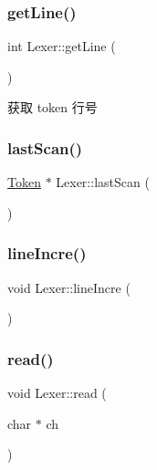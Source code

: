 \mbox{\label{class_lexer_a0ede40225695d9eb9b42d275584cf8f0}} 
\subsubsection{\texorpdfstring{get\+Line()}{getLine()}}
{\footnotesize\ttfamily int Lexer\+::get\+Line (\begin{DoxyParamCaption}{ }\end{DoxyParamCaption})\hspace{0.3cm}{\ttfamily [static]}}



获取 token 行号 

\mbox{\label{class_lexer_a28eb3e3a349bcbc7a0b03e16bb42192f}} 
\subsubsection{\texorpdfstring{last\+Scan()}{lastScan()}}
{\footnotesize\ttfamily \hyperlink{class_token}{Token} $\ast$ Lexer\+::last\+Scan (\begin{DoxyParamCaption}{ }\end{DoxyParamCaption})\hspace{0.3cm}{\ttfamily [private]}}

\mbox{\label{class_lexer_a48478c1d6556ce949e7808bf3e2604b7}} 
\subsubsection{\texorpdfstring{line\+Incre()}{lineIncre()}}
{\footnotesize\ttfamily void Lexer\+::line\+Incre (\begin{DoxyParamCaption}{ }\end{DoxyParamCaption})\hspace{0.3cm}{\ttfamily [static]}}

\mbox{\label{class_lexer_abb0f5b7f1e6fd685c8c8e9074553c67f}} 
\subsubsection{\texorpdfstring{read()}{read()}}
{\footnotesize\ttfamily void Lexer\+::read (\begin{DoxyParamCaption}\item[{char $\ast$}]{ch }\end{DoxyParamCaption})\hspace{0.3cm}{\ttfamily [private]}}



